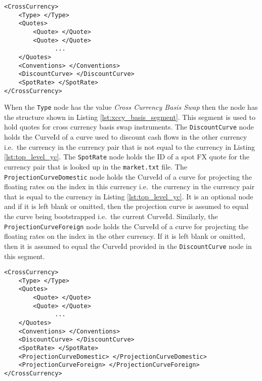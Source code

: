 {\footnotesize
\begin{lstlisting}[caption=FX forward yield curve segment, label=lst:fx_forward_segment]
<CrossCurrency>
	<Type> </Type>
	<Quotes>
		<Quote> </Quote>
		<Quote> </Quote>
		      ...
	</Quotes>
	<Conventions> </Conventions>
	<DiscountCurve> </DiscountCurve>
	<SpotRate> </SpotRate>
</CrossCurrency>
\end{lstlisting}
}

When the \lstinline!Type! node has the value \emph{Cross Currency Basis Swap} then the node has the structure shown in 
Listing \ref{lst:xccy_basis_segment}. This segment is used to hold quotes for cross currency basis swap instruments. The 
\lstinline!DiscountCurve! node holds the CurveId of a curve used to discount cash flows in the other currency i.e.\ the 
currency in the currency pair that is not equal to the currency in Listing \ref{lst:top_level_yc}. The 
\lstinline!SpotRate! node holds the ID of a spot FX quote for the currency pair that is looked up in the {\tt market.txt} 
file. The \lstinline!ProjectionCurveDomestic! node holds the CurveId of a curve for projecting the floating rates on the 
index in this currency i.e.\ the currency in the currency pair that is equal to the currency in Listing 
\ref{lst:top_level_yc}. It is an optional node and if it is left blank or omitted, then the projection curve is assumed to 
equal the curve being bootstrapped i.e.\ the current CurveId. Similarly, the \lstinline!ProjectionCurveForeign! node holds 
the CurveId of a curve for projecting the floating rates on the index in the other currency. If it is left blank or 
omitted, then it is assumed to equal the CurveId provided in the \lstinline!DiscountCurve! node in this segment.

{\footnotesize
\begin{lstlisting}[caption=Cross currency basis yield curve segment, label=lst:xccy_basis_segment]
<CrossCurrency>
	<Type> </Type>
	<Quotes>
		<Quote> </Quote>
		<Quote> </Quote>
		      ...
	</Quotes>
	<Conventions> </Conventions>
	<DiscountCurve> </DiscountCurve>
	<SpotRate> </SpotRate>
	<ProjectionCurveDomestic> </ProjectionCurveDomestic>
	<ProjectionCurveForeign> </ProjectionCurveForeign>
</CrossCurrency>
\end{lstlisting}
}